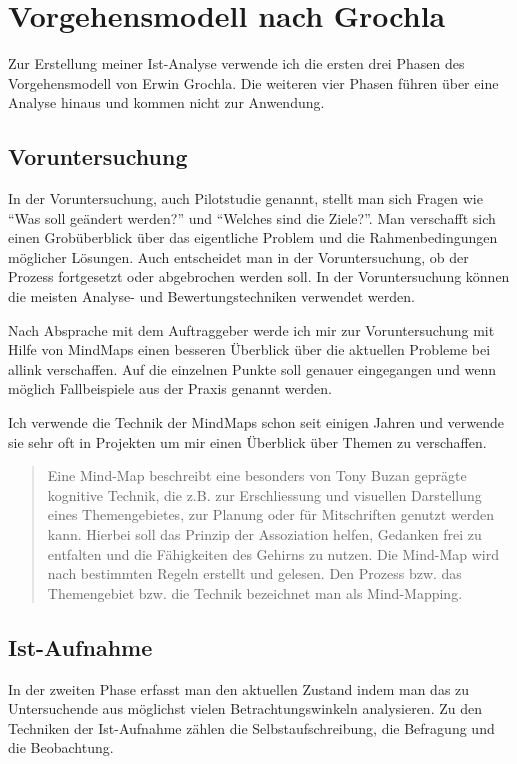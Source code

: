 \section{Vorgehensmodell nach Grochla}
Zur Erstellung meiner Ist-Analyse verwende ich die ersten drei Phasen des 
Vorgehensmodell von Erwin Grochla\cite[S. 44-74]{grochla1982grundlagen}.
Die weiteren vier Phasen führen über eine Analyse hinaus und kommen
nicht zur Anwendung.

\subsection{Voruntersuchung}
In der Voruntersuchung, auch Pilotstudie genannt, stellt man sich Fragen wie
``Was soll geändert werden?'' und ``Welches sind die Ziele?''. Man verschafft
sich einen Grobüberblick über das eigentliche Problem und die Rahmenbedingungen
möglicher Lösungen. Auch entscheidet man in der Voruntersuchung, ob der Prozess
fortgesetzt oder abgebrochen werden soll. In der Voruntersuchung können die 
meisten Analyse- und Bewertungstechniken verwendet werden.

Nach Absprache mit dem Auftraggeber werde ich mir zur Voruntersuchung mit  
Hilfe von MindMaps einen besseren Überblick über die aktuellen Probleme bei
allink verschaffen. Auf die einzelnen Punkte soll genauer eingegangen
und wenn möglich Fallbeispiele aus der Praxis genannt werden.

Ich verwende die Technik der MindMaps schon seit einigen Jahren und verwende
sie sehr oft in Projekten um mir einen Überblick über Themen zu verschaffen.

\begin{quotation}
Eine Mind-Map beschreibt eine besonders von Tony Buzan geprägte kognitive 
Technik, die z.B. zur Erschliessung und visuellen Darstellung eines Themengebietes, 
zur Planung oder für Mitschriften genutzt werden kann. Hierbei soll das Prinzip 
der Assoziation helfen, Gedanken frei zu entfalten und die Fähigkeiten des Gehirns 
zu nutzen. Die Mind-Map wird nach bestimmten Regeln erstellt und gelesen. Den 
Prozess bzw. das Themengebiet bzw. die Technik bezeichnet man als Mind-Mapping.
\cite{wikipedia_mindmap}
\end{quotation}

\subsection{Ist-Aufnahme}
In der zweiten Phase erfasst man den aktuellen Zustand indem man das zu 
Untersuchende aus möglichst vielen Betrachtungswinkeln analysieren. Zu den
Techniken der Ist-Aufnahme zählen die Selbstaufschreibung, die Befragung und 
die Beobachtung.


